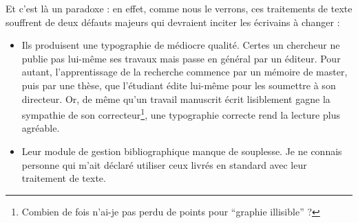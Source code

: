Et c'est là un paradoxe : en effet, comme nous le verrons, ces traitements de texte souffrent de deux défauts majeurs qui devraient inciter les écrivains à changer :
\begin{itemize}
\item Ils produisent une typographie de médiocre qualité. Certes un chercheur ne publie pas lui-même ses travaux mais passe en général par un éditeur. Pour autant, l'apprentissage de la recherche commence par un mémoire de master, puis par une thèse, que l'étudiant édite lui-même pour les soumettre à son directeur. Or, de même qu'un travail manuscrit écrit lisiblement gagne la sympathie de son correcteur\footnote{Combien de fois n'ai-je pas perdu de points pour \enquote{graphie illisible} ?},  une typographie correcte rend la lecture plus agréable.
\item Leur module de gestion bibliographique manque de souplesse. Je ne connais personne qui m'ait déclaré utiliser ceux livrés en standard avec leur traitement de texte.
\end{itemize}

%
%
%
%
%
%


